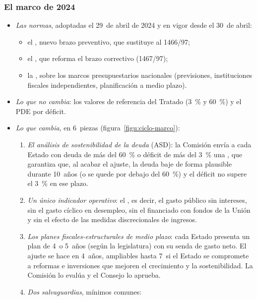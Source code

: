 \documentclass[11pt]{article}
\begin{document}
\subsubsection{El marco de 2024}\label{sec:marco-2024}

\begin{itemize}
\item \emph{Las normas}, adoptadas el 29~de abril de 2024 y en vigor desde el 30~de abril\nocite{UE2024Reglamento1263,UE2024Reglamento1264,DirUE2024Marcos}:
  \begin{itemize}
  \item el , nuevo brazo preventivo, que sustituye al 1466/97;
  \item el , que reforma el brazo correctivo (1467/97);
  \item la , sobre los marcos presupuestarios nacionales (previsiones, instituciones fiscales independientes, planificación a medio plazo).
  \end{itemize}
\item \emph{Lo que no cambia}: los valores de referencia del Tratado (3~\% y 60~\%) y el PDE por déficit.
\item \emph{Lo que cambia}, en 6~piezas (figura~\ref{figu:ciclo-marco}):
  \begin{enumerate}
  \item \emph{El análisis de sostenibilidad de la deuda} (ASD): la Comisión envía a cada Estado con deuda de más del 60~\% o déficit de más del 3~\% una , que garantiza que, al acabar el ajuste, la deuda baje de forma plausible durante 10~años (o se quede por debajo del 60~\%) y el déficit no supere el 3~\% en ese plazo.
  \item \emph{Un único indicador operativo}: el , es decir, el gasto público sin intereses, sin el gasto cíclico en desempleo, sin el financiado con fondos de la Unión y sin el efecto de las medidas discrecionales de ingresos.
  \item \emph{Los planes fiscales-estructurales de medio plazo}: cada Estado presenta un plan de 4~o 5~años (según la legislatura) con su senda de gasto neto. El ajuste se hace en 4~años, ampliables hasta 7~si el Estado se compromete a reformas e inversiones que mejoren el crecimiento y la sostenibilidad. La Comisión lo evalúa y el Consejo lo aprueba.
  \item \emph{Dos salvaguardias}, mínimos comunes:

\end{enumerate}
\end{itemize}
\end{document}
